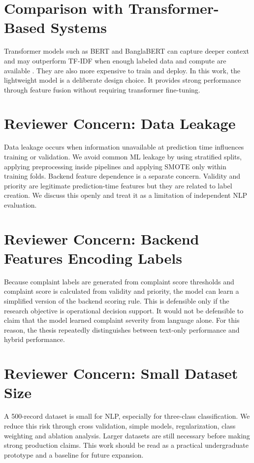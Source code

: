 \documentclass[12pt,a4paper,openany]{book}
\begin{document}
\section{Comparison with Transformer-Based Systems}
Transformer models such as BERT and BanglaBERT can capture deeper context and may outperform TF-IDF when enough labeled data and compute are available \cite{devlin2019bert,bhattacharjee2022banglabert}. They are also more expensive to train and deploy. In this work, the lightweight model is a deliberate design choice. It provides strong performance through feature fusion without requiring transformer fine-tuning.

\section{Reviewer Concern: Data Leakage}
Data leakage occurs when information unavailable at prediction time influences training or validation. We avoid common ML leakage by using stratified splits, applying preprocessing inside pipelines and applying SMOTE only within training folds. Backend feature dependence is a separate concern. Validity and priority are legitimate prediction-time features but they are related to label creation. We discuss this openly and treat it as a limitation of independent NLP evaluation.

\section{Reviewer Concern: Backend Features Encoding Labels}
Because complaint labels are generated from complaint score thresholds and complaint score is calculated from validity and priority, the model can learn a simplified version of the backend scoring rule. This is defensible only if the research objective is operational decision support. It would not be defensible to claim that the model learned complaint severity from language alone. For this reason, the thesis repeatedly distinguishes between text-only performance and hybrid performance.

\section{Reviewer Concern: Small Dataset Size}
A 500-record dataset is small for NLP, especially for three-class classification. We reduce this risk through cross validation, simple models, regularization, class weighting and ablation analysis. Larger datasets are still necessary before making strong production claims. This work should be read as a practical undergraduate prototype and a baseline for future expansion.
\end{document}
